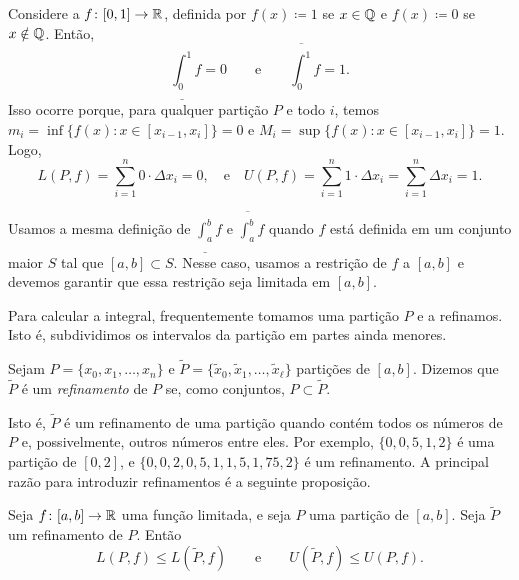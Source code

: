 \begin{example} \label{example:dirichletfunc}
Considere a 
$f \colon [0,1] \to {\mathbb{R}}$, definida por $f(x) \coloneqq 1$ se
$x \in {\mathbb{Q}}$ e $f(x) \coloneqq 0$ se $x \notin {\mathbb{Q}}$. Então,
\begin{equation*}
\underline{\int_0^1} f = 0 \qquad \text{e} \qquad
\overline{\int_0^1} f = 1 .
\end{equation*}
Isso ocorre porque, para qualquer partição $P$ e todo $i$, temos
$m_i = \inf \bigl\{ f(x) : x \in [x_{i-1},x_i] \bigr\} = 0$ e
$M_i = \sup \bigl\{ f(x) : x \in [x_{i-1},x_i] \bigr\} = 1$. Logo,
\begin{equation*}
L(P,f) = \sum_{i=1}^n 0 \cdot \Delta x_i = 0 , \quad \text{e} \quad
U(P,f) = \sum_{i=1}^n 1 \cdot \Delta x_i = \sum_{i=1}^n \Delta x_i = 1  .
\end{equation*}
\end{example}

\begin{remark}
Usamos a mesma definição de $\underline{\int_a^b} f$ e
$\overline{\int_a^b} f$
quando $f$ está definida em um conjunto maior $S$ tal que
$[a,b] \subset S$. Nesse caso, usamos a restrição de $f$ a $[a,b]$
e devemos garantir que essa restrição seja limitada em $[a,b]$.
\end{remark}

Para calcular a integral, frequentemente tomamos uma partição $P$ e a
refinamos. Isto é, subdividimos os intervalos da partição em partes ainda
menores.

\begin{defn}
Sejam $P = \{ x_0, x_1, \ldots, x_n \}$ e
$\widetilde{P} = \{ \widetilde{x}_0, \widetilde{x}_1, \ldots,
\widetilde{x}_{\ell} \}$
partições de $[a,b]$. Dizemos que $\widetilde{P}$ é um
\emph{refinamento} de $P$
se, como conjuntos, $P \subset \widetilde{P}$.
\end{defn}

Isto é, $\widetilde{P}$ é um refinamento de uma partição quando contém todos
os números de $P$ e, possivelmente, outros números entre eles. Por exemplo,
$\{ 0, 0{,}5, 1, 2 \}$ é uma partição de $[0,2]$, e
$\{ 0, 0{,}2, 0{,}5, 1, 1{,}5, 1{,}75, 2 \}$ é um refinamento.
A principal razão para introduzir refinamentos é a seguinte proposição.

\begin{prop} \label{prop:refinement}
Seja $f \colon [a,b] \to {\mathbb{R}}$ uma função limitada, e seja $P$
uma partição de $[a,b]$. Seja $\widetilde{P}$ um refinamento de $P$.
Então
\begin{equation*}
L(P,f) \leq L(\widetilde{P},f) 
\qquad \text{e} \qquad
U(\widetilde{P},f) \leq U(P,f) .
\end{equation*}
\end{prop}

